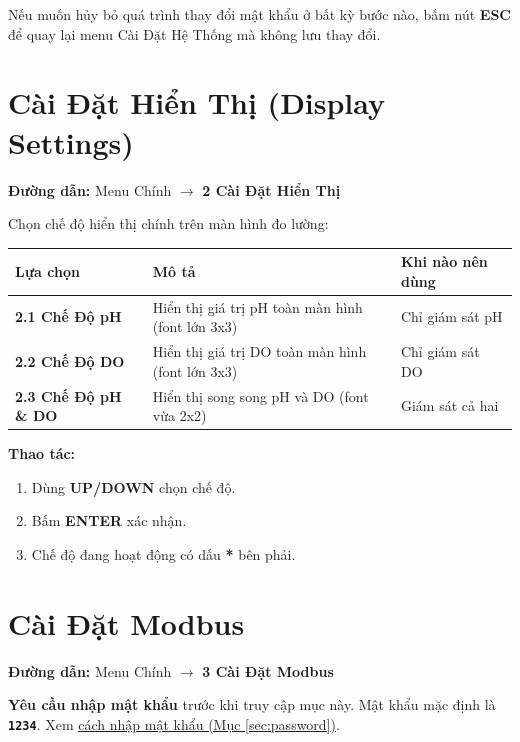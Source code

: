 \documentclass[12pt,a4paper]{article}
\begin{document}
\begin{notebox}
Nếu muốn hủy bỏ quá trình thay đổi mật khẩu ở bất kỳ bước nào, bấm nút \textbf{ESC} để quay lại menu Cài Đặt Hệ Thống mà không lưu thay đổi.
\end{notebox}


\section{Cài Đặt Hiển Thị (Display Settings)}

\textbf{Đường dẫn:} Menu Chính $\rightarrow$ \textbf{2 Cài Đặt Hiển Thị}

Chọn chế độ hiển thị chính trên màn hình đo lường:
\begin{table}[H]
\centering
\begin{tabularx}{\textwidth}{|l|X|X|}
\hline
\textbf{Lựa chọn} & \textbf{Mô tả} & \textbf{Khi nào nên dùng} \\ \hline
\textbf{2.1 Chế Độ pH} & Hiển thị giá trị pH toàn màn hình (font lớn 3x3) & Chỉ giám sát pH \\ \hline
\textbf{2.2 Chế Độ DO} & Hiển thị giá trị DO toàn màn hình (font lớn 3x3) & Chỉ giám sát DO \\ \hline
\textbf{2.3 Chế Độ pH \& DO} & Hiển thị song song pH và DO (font vừa 2x2) & Giám sát cả hai \\ \hline
\end{tabularx}
\end{table}

\textbf{Thao tác:}
\begin{enumerate}
    \item Dùng \textbf{UP/DOWN} chọn chế độ.
    \item Bấm \textbf{ENTER} xác nhận.
    \item Chế độ đang hoạt động có dấu \textbf{*} bên phải.
\end{enumerate}


\section{Cài Đặt Modbus}

\textbf{Đường dẫn:} Menu Chính $\rightarrow$ \textbf{3 Cài Đặt Modbus}

\begin{importantbox}
\textbf{Yêu cầu nhập mật khẩu} trước khi truy cập mục này. Mật khẩu mặc định là \textbf{\texttt{1234}}. Xem \hyperref[sec:password]{cách nhập mật khẩu (Mục \ref*{sec:password})}.
\end{importantbox}
\end{document}
